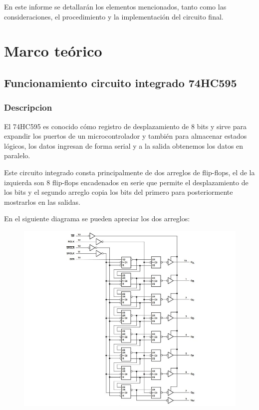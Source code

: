 \documentclass{article}
\begin{document}
En este informe se detallarán los elementos mencionados, tanto como las consideraciones, el procedimiento y la implementación del circuito final.


\newpage

\section{Marco teórico}

\subsection{Funcionamiento circuito integrado 74HC595}

\subsubsection{Descripcion}
El 74HC595 es conocido cómo registro de desplazamiento de 8 bits y sirve para expandir los puertos de un microcontrolador y también para almacenar estados lógicos, los datos ingresan de forma serial y a la salida obtenemos los datos en paralelo.\newline

Este circuito integrado consta principalmente de dos arreglos de flip-flops, el de la izquierda son 8 flip-flops encadenados en serie que permite el desplazamiento de los bits y el segundo arreglo copia los bits del primero para posteriormente mostrarlos en las salidas. \newline 

En el siguiente diagrama se pueden apreciar los dos arreglos:

\begin{figure}[!ht]
\includegraphics[width=14cm]{74HC595.jpg}
\centering
\cite{Datashet}
\end{figure}
\end{document}
